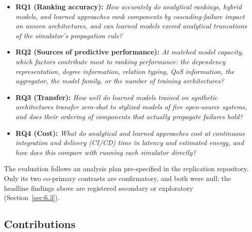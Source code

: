 \begin{itemize}\tightlist
\item \textbf{RQ1 (Ranking accuracy):} \emph{How accurately do analytical rankings, hybrid models, and learned approaches rank components by cascading-failure impact on unseen architectures, and can learned models exceed analytical truncations of the simulator's propagation rule?}
\item \textbf{RQ2 (Sources of predictive performance):} \emph{At matched model capacity, which factors contribute most to ranking performance: the dependency representation, degree information, relation typing, QoS information, the aggregator, the model family, or the number of training architectures?}
\item \textbf{RQ3 (Transfer):} \emph{How well do learned models trained on synthetic architectures transfer zero-shot to stylized models of five open-source systems, and does their ordering of components that actually propagate failures hold?}
\item \textbf{RQ4 (Cost):} \emph{What do analytical and learned approaches cost at continuous integration and delivery (CI/CD) time in latency and estimated energy, and how does this compare with running each simulator directly?}
\end{itemize}

The evaluation follows an analysis plan pre-specified in the replication repository. Only its two co-primary contrasts are confirmatory, and both were null; the headline findings above are registered secondary or exploratory (Section~\ref{sec:6.3}).

\subsection{Contributions}
\label{sec:1.5}

